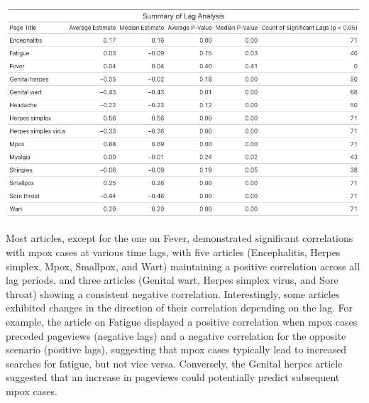\documentclass[
  12pt,
]{article}
\begin{document}
\includegraphics{images/lag-analysis-summary-table.png}

Most articles, except for the one on Fever, demonstrated significant
correlations with mpox cases at various time lags, with five articles
(Encephalitis, Herpes simplex, Mpox, Smallpox, and Wart) maintaining a
positive correlation across all lag periods, and three articles (Genital
wart, Herpes simplex virus, and Sore throat) showing a consistent
negative correlation. Interestingly, some articles exhibited changes in
the direction of their correlation depending on the lag. For example,
the article on Fatigue displayed a positive correlation when mpox cases
preceded pageviews (negative lags) and a negative correlation for the
opposite scenario (positive lags), suggesting that mpox cases typically
lead to increased searches for fatigue, but not vice versa. Conversely,
the Genital herpes article suggested that an increase in pageviews could
potentially predict subsequent mpox cases.~
\end{document}
